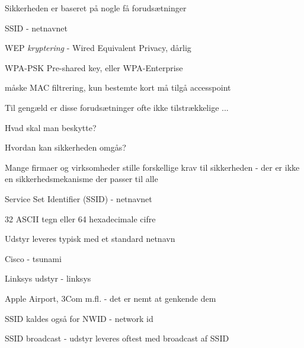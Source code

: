 \documentclass[Screen16to9,17pt]{foils}
\begin{document}


\begin{list1}
\item Sikkerheden er baseret på nogle få forudsætninger
  \begin{list2}
  \item SSID - netnavnet
  \item WEP \emph{kryptering} - Wired Equivalent Privacy, dårlig
\item WPA-PSK Pre-shared key, eller WPA-Enterprise
  \item måske MAC filtrering, kun bestemte kort må tilgå accesspoint
  \end{list2}
\end{list1}



\begin{list1}
\item Til gengæld er disse forudsætninger ofte ikke tilstrækkelige ...
\item Hvad skal man beskytte?
\item Hvordan kan sikkerheden omgås?
\item Mange firmaer og virksomheder stille forskellige krav til
  sikkerheden - der er ikke en sikkerhedsmekanisme der passer til alle
\end{list1}


\begin{list1}
\item Service Set Identifier (SSID) - netnavnet
\item 32 ASCII tegn eller 64 hexadecimale cifre
\item Udstyr leveres typisk med et standard netnavn
\begin{list2}
\item Cisco - tsunami
\item Linksys udstyr - linksys
\item Apple Airport, 3Com m.fl. - det er nemt at genkende dem
\end{list2}
\item SSID kaldes også for NWID - network id
\item SSID broadcast - udstyr leveres oftest med broadcast af SSID
\end{list1}
\end{document}
